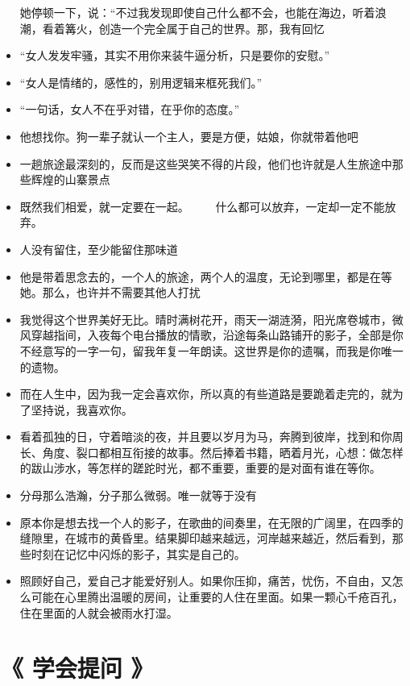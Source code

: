 \documentclass[UTF8,a4paper,8pt]{ctexbook}
\begin{document}
\begin{itemize}
					她停顿一下，说：“不过我发现即使自己什么都不会，也能在海边，听着浪潮，看着篝火，创造一个完全属于自己的世界。那，我有回忆
					\item “女人发发牢骚，其实不用你来装牛逼分析，只是要你的安慰。”
					\item “女人是情绪的，感性的，别用逻辑来框死我们。”
					\item “一句话，女人不在乎对错，在乎你的态度。”
					\item 他想找你。狗一辈子就认一个主人，要是方便，姑娘，你就带着他吧
					\item 一趟旅途最深刻的，反而是这些哭笑不得的片段，他们也许就是人生旅途中那些辉煌的山寨景点
					\item 既然我们相爱，就一定要在一起。 　　什么都可以放弃，一定却一定不能放弃。
					\item 人没有留住，至少能留住那味道
					\item 他是带着思念去的，一个人的旅途，两个人的温度，无论到哪里，都是在等她。那么，也许并不需要其他人打扰
					\item 我觉得这个世界美好无比。晴时满树花开，雨天一湖涟漪，阳光席卷城市，微风穿越指间，入夜每个电台播放的情歌，沿途每条山路铺开的影子，全部是你不经意写的一字一句，留我年复一年朗读。这世界是你的遗嘱，而我是你唯一的遗物。
					\item 而在人生中，因为我一定会喜欢你，所以真的有些道路是要跪着走完的，就为了坚持说，我喜欢你。
					\item 看着孤独的日，守着暗淡的夜，并且要以岁月为马，奔腾到彼岸，找到和你周长、角度、裂口都相互衔接的故事。然后捧着书籍，晒着月光，心想：做怎样的跋山涉水，等怎样的蹉跎时光，都不重要，重要的是对面有谁在等你。
					\item 分母那么浩瀚，分子那么微弱。唯一就等于没有
					\item 原本你是想去找一个人的影子，在歌曲的间奏里，在无限的广阔里，在四季的缝隙里，在城市的黄昏里。结果脚印越来越远，河岸越来越近，然后看到，那些时刻在记忆中闪烁的影子，其实是自己的。
					\item 照顾好自己，爱自己才能爱好别人。如果你压抑，痛苦，忧伤，不自由，又怎么可能在心里腾出温暖的房间，让重要的人住在里面。如果一颗心千疮百孔，住在里面的人就会被雨水打湿。
				\end{itemize}			
		\newpage			
	\section{《 学会提问 》 }  
	
		\newpage			
\end{document}
